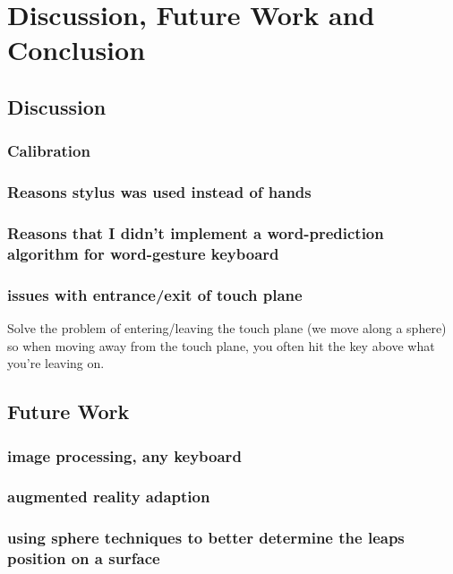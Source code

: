 \chapter{Discussion, Future Work and Conclusion}

\section{Discussion}

\subsection{Calibration}

\subsection{Reasons stylus was used instead of hands}

\subsection{Reasons that I didn't implement a word-prediction algorithm for word-gesture keyboard}

\subsection{issues with entrance/exit of touch plane}
Solve the problem of entering/leaving the touch plane (we move along a sphere) so when
	moving away from the touch plane, you often hit the key above what you're leaving on.

\section{Future Work}

\subsection{image processing, any keyboard}

\subsection{augmented reality adaption}

\subsection{using sphere techniques to better determine the leaps position on a surface}

